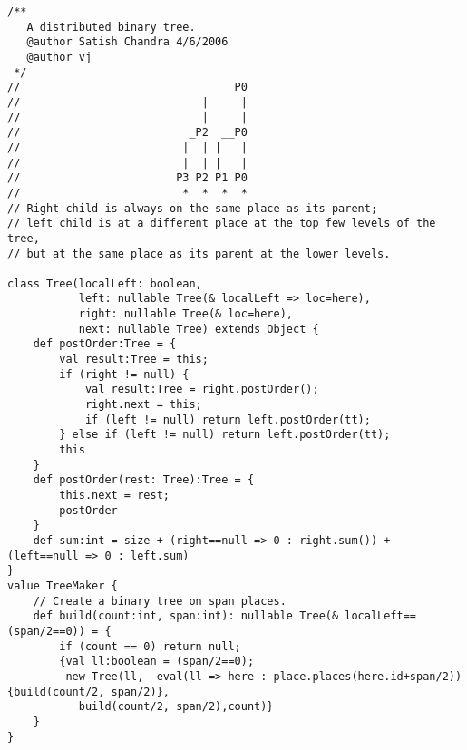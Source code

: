 {\footnotesize
\begin{verbatim}
/**
   A distributed binary tree.
   @author Satish Chandra 4/6/2006
   @author vj
 */
//                             ____P0
//                            |     |
//                            |     |
//                          _P2  __P0
//                         |  | |   |
//                         |  | |   |
//                        P3 P2 P1 P0
//                         *  *  *  *
// Right child is always on the same place as its parent;
// left child is at a different place at the top few levels of the tree,
// but at the same place as its parent at the lower levels.

class Tree(localLeft: boolean,
           left: nullable Tree(& localLeft => loc=here),
           right: nullable Tree(& loc=here),
           next: nullable Tree) extends Object {
    def postOrder:Tree = {
        val result:Tree = this;
        if (right != null) {
            val result:Tree = right.postOrder();
            right.next = this;
            if (left != null) return left.postOrder(tt);
        } else if (left != null) return left.postOrder(tt);
        this
    }
    def postOrder(rest: Tree):Tree = {
        this.next = rest;
        postOrder
    }
    def sum:int = size + (right==null => 0 : right.sum()) + (left==null => 0 : left.sum)
}
value TreeMaker {
    // Create a binary tree on span places.
    def build(count:int, span:int): nullable Tree(& localLeft==(span/2==0)) = {
        if (count == 0) return null;
        {val ll:boolean = (span/2==0);
         new Tree(ll,  eval(ll => here : place.places(here.id+span/2)){build(count/2, span/2)},
           build(count/2, span/2),count)}
    }
}
\end{verbatim}}

